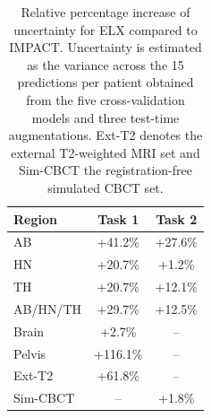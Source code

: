 \begin{table}[h!]
\centering
\small
\setlength{\tabcolsep}{6pt}
\renewcommand{\arraystretch}{1.15}
\caption{
Relative percentage increase of uncertainty for ELX compared to IMPACT. 
Uncertainty is estimated as the variance across the 15 predictions per patient obtained from the five cross-validation models and three test-time augmentations. Ext-T2 denotes the external T2-weighted MRI set and Sim-CBCT the registration-free simulated CBCT set.
}
\label{tab:cv_uncertainty_mae_percentage}
\begin{tabular}{lcc}
\toprule
Region & Task 1 & Task 2 \\
\midrule
AB & +41.2\% & +27.6\% \\
HN & +20.7\% & +1.2\% \\
TH & +20.7\% & +12.1\% \\
AB/HN/TH & +29.7\% & +12.5\% \\
\addlinespace[0.25em]
\hline
\hline
\addlinespace[0.25em]
Brain & +2.7\% & -- \\
Pelvis & +116.1\% & --\\
Ext-T2 & +61.8\% & -- \\
Sim-CBCT & -- & +1.8\% \\
\bottomrule
\end{tabular}

\end{table}

